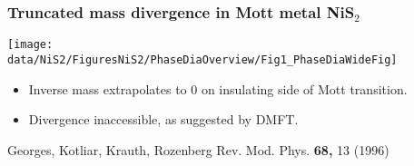 \begin{frame}[label=QONiS2-2]
\frametitle{Truncated mass divergence in Mott metal NiS$_2$}

\centerline{\texttt{[image: \\data/NiS2/FiguresNiS2/PhaseDiaOverview/Fig1\_PhaseDiaWideFig]}}
\begin{itemize}
\item<1->
Inverse mass extrapolates to 0 on insulating side of Mott
transition.
\item<visible@2->
Divergence inaccessible, as suggested by DMFT.

\end{itemize}

\vspace*{\fill}
\vspace{-0.25em}
\centerline{\makebox[\linewidth]{\rule{0.85\textwidth}{0.4pt}}}
\centerline{\scriptsize Georges, Kotliar, Krauth, Rozenberg
  Rev. Mod. Phys. {\bf 68,} 13 (1996)}
\end{frame}







